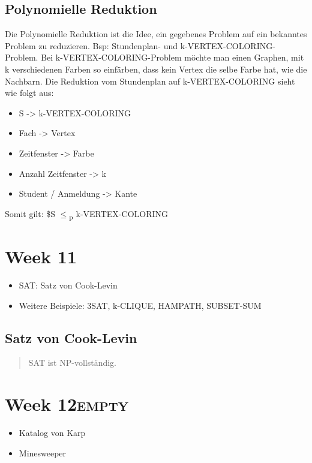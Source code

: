 \documentclass[11pt,twoside,landscape]{article}
\begin{document}
\begin{multicols}{3}
\subsection*{Polynomielle Reduktion}
\label{sec:org16f38c8}
Die Polynomielle Reduktion ist die Idee, ein gegebenes Problem auf ein bekanntes Problem zu reduzieren.
Bsp: Stundenplan- und k-VERTEX-COLORING-Problem. Bei k-VERTEX-COLORING-Problem möchte man einen Graphen, mit k verschiedenen Farben so einfärben, dass kein Vertex die selbe Farbe hat, wie die Nachbarn. Die Reduktion vom Stundenplan auf k-VERTEX-COLORING sieht wie folgt aus:

\begin{itemize}
\item S -> k-VERTEX-COLORING
\item Fach -> Vertex
\item Zeitfenster -> Farbe
\item Anzahl Zeitfenster -> k
\item Student / Anmeldung -> Kante
\end{itemize}

Somit gilt: \$S \(\le\)\textsubscript{p} k-VERTEX-COLORING

\section*{Week 11}
\label{sec:orgc521ec7}
\begin{itemize}
\item SAT: Satz von Cook-Levin
\item Weitere Beispiele: 3SAT, k-CLIQUE, HAMPATH, SUBSET-SUM
\end{itemize}


\subsection*{Satz von Cook-Levin}
\label{sec:orgdcaaac6}
\begin{quote}
SAT ist NP-vollständig.
\end{quote}

\section*{Week 12\hfill{}\textsc{empty}}
\label{sec:orgc350c08}
\begin{itemize}
\item Katalog von Karp
\item Minesweeper
\end{itemize}



\end{multicols}
\end{document}
